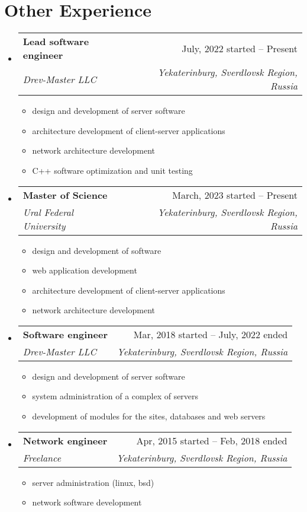 \documentclass[letterpaper,11pt]{article}
\makeatletter
\newcommand{\resumeItem}[1]{
    \item{
                {#1 \vspace{-4pt}}
          }
}
\newcommand{\resumeSubheading}[4]{
    \vspace{-2pt}\item
    \begin{tabular*}{0.97\textwidth}[t]{l@{\extracolsep{\fill}}r}
        \textbf{#1} & #2 \\
        \textit{\small #3} & \textit{\small #4} \\
    \end{tabular*}\vspace{-10pt}
}
\newcommand{\resumeSubHeadingListStart}{\begin{itemize}[leftmargin=0.15in, label={}]}
\newcommand{\resumeSubHeadingListEnd}{\end{itemize}}
\newcommand{\resumeItemListStart}{\begin{itemize}}
\newcommand{\resumeItemListEnd}{\end{itemize}\vspace{-2pt}}
\makeatother
\begin{document}

\section{Other Experience}
\resumeSubHeadingListStart

\resumeSubheading
    {Lead software engineer}{July, 2022 started -- Present}
    {Drev-Master LLC}{Yekaterinburg, Sverdlovsk Region, Russia}
    \resumeItemListStart
        \small\resumeItem{design and development of server software}
        \resumeItem{architecture development of client-server applications}
        \resumeItem{network architecture development}
        \resumeItem{C++ software optimization and unit testing}
    \resumeItemListEnd

\resumeSubheading
    {Master of Science}{March, 2023 started -- Present}
    {Ural Federal University}{Yekaterinburg, Sverdlovsk Region, Russia}
    \resumeItemListStart
        \small\resumeItem{design and development of software}
        \resumeItem{web application development}
        \resumeItem{architecture development of client-server applications}
        \resumeItem{network architecture development}
    \resumeItemListEnd

\resumeSubheading
    {Software engineer}{Mar, 2018 started -- July, 2022 ended}
    {Drev-Master LLC}{Yekaterinburg, Sverdlovsk Region, Russia}
    \resumeItemListStart
        \small\resumeItem{design and development of server software}
        \resumeItem{system administration of a complex of servers}
        \resumeItem{development of modules for the sites, databases and web servers}
    \resumeItemListEnd

\resumeSubheading
    {Network engineer}{Apr, 2015 started -- Feb, 2018 ended}
    {Freelance}{Yekaterinburg, Sverdlovsk Region, Russia}
    \resumeItemListStart
        \small\resumeItem{server administration (linux, bsd)}
        \resumeItem{network software development}
    \resumeItemListEnd

\resumeSubHeadingListEnd

\end{document}
